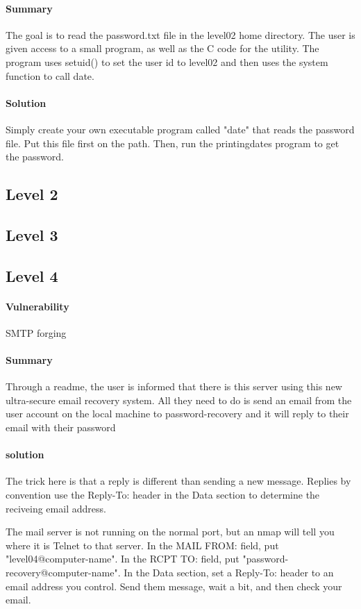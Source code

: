 \documentclass[12pt]{article}
\begin{document}
\paragraph{Summary} The goal is to read the password.txt file in the level02
home directory. The user is given access to a small program, as well as the
C code for the utility. The program uses setuid() to set the user id to level02
and then uses the system function to call date.
\paragraph{Solution} Simply create your own executable program called "date"
that reads the password file. Put this file first on the path. Then, run the
printingdates program to get the password.

\subsection{Level 2}

\subsection{Level 3}

\subsection{Level 4}
\paragraph{Vulnerability} SMTP forging
\paragraph{Summary} Through a readme, the user is informed that there is this
server using this new ultra-secure email recovery system. All they need to do
is send an email from the user account on the local machine to
password-recovery and it will reply to their email with their password 
\paragraph{solution} The trick here is that a reply is different than sending a
new message. Replies by convention use the Reply-To: header in the Data section
to determine the reciveing email address. 

The mail server is not running on the normal port, but an
nmap will tell you where it is Telnet to that server. In the MAIL FROM: field,
put "level04@computer-name". In the RCPT TO: field, put
"password-recovery@computer-name". In the Data section, set a Reply-To:
header to an email address you control. Send them message, wait a bit, and then
check your email. 
\end{document}
